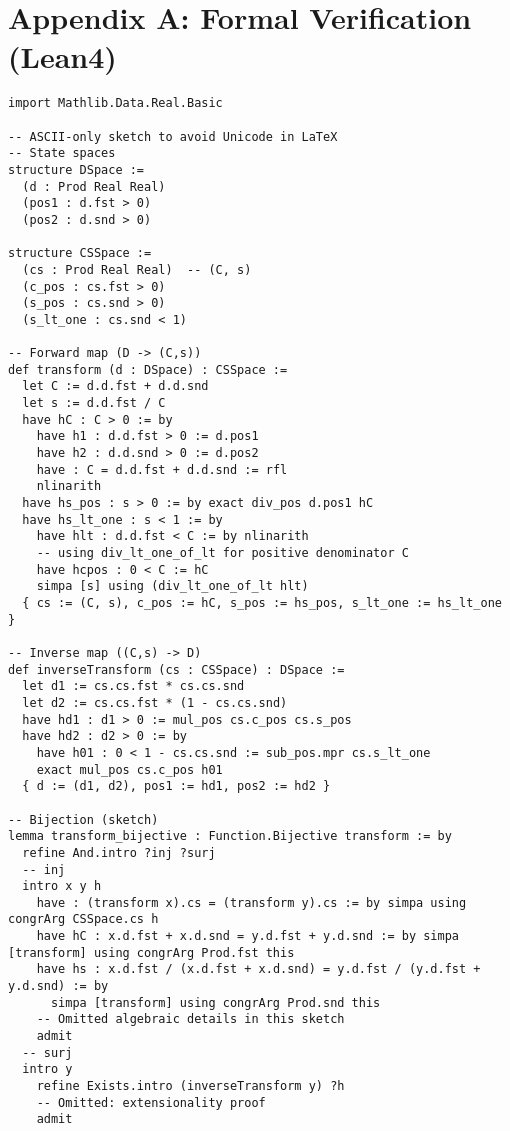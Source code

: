 ﻿\documentclass[11pt,letterpaper,oneside]{article}
\numberwithin{equation}{section}
\newcommand{\1}{\mathbf{1}}
\begin{document}
\appendix
\section{Appendix A: Formal Verification (Lean4)}\label{app:lean_verification}
\begin{leanproof}
\begin{lstlisting}[basicstyle=\ttfamily\small]
import Mathlib.Data.Real.Basic

-- ASCII-only sketch to avoid Unicode in LaTeX
-- State spaces
structure DSpace :=
  (d : Prod Real Real)
  (pos1 : d.fst > 0)
  (pos2 : d.snd > 0)

structure CSSpace :=
  (cs : Prod Real Real)  -- (C, s)
  (c_pos : cs.fst > 0)
  (s_pos : cs.snd > 0)
  (s_lt_one : cs.snd < 1)

-- Forward map (D -> (C,s))
def transform (d : DSpace) : CSSpace :=
  let C := d.d.fst + d.d.snd
  let s := d.d.fst / C
  have hC : C > 0 := by
    have h1 : d.d.fst > 0 := d.pos1
    have h2 : d.d.snd > 0 := d.pos2
    have : C = d.d.fst + d.d.snd := rfl
    nlinarith
  have hs_pos : s > 0 := by exact div_pos d.pos1 hC
  have hs_lt_one : s < 1 := by
    have hlt : d.d.fst < C := by nlinarith
    -- using div_lt_one_of_lt for positive denominator C
    have hcpos : 0 < C := hC
    simpa [s] using (div_lt_one_of_lt hlt)
  { cs := (C, s), c_pos := hC, s_pos := hs_pos, s_lt_one := hs_lt_one }

-- Inverse map ((C,s) -> D)
def inverseTransform (cs : CSSpace) : DSpace :=
  let d1 := cs.cs.fst * cs.cs.snd
  let d2 := cs.cs.fst * (1 - cs.cs.snd)
  have hd1 : d1 > 0 := mul_pos cs.c_pos cs.s_pos
  have hd2 : d2 > 0 := by
    have h01 : 0 < 1 - cs.cs.snd := sub_pos.mpr cs.s_lt_one
    exact mul_pos cs.c_pos h01
  { d := (d1, d2), pos1 := hd1, pos2 := hd2 }

-- Bijection (sketch)
lemma transform_bijective : Function.Bijective transform := by
  refine And.intro ?inj ?surj
  -- inj
  intro x y h
    have : (transform x).cs = (transform y).cs := by simpa using congrArg CSSpace.cs h
    have hC : x.d.fst + x.d.snd = y.d.fst + y.d.snd := by simpa [transform] using congrArg Prod.fst this
    have hs : x.d.fst / (x.d.fst + x.d.snd) = y.d.fst / (y.d.fst + y.d.snd) := by
      simpa [transform] using congrArg Prod.snd this
    -- Omitted algebraic details in this sketch
    admit
  -- surj
  intro y
    refine Exists.intro (inverseTransform y) ?h
    -- Omitted: extensionality proof
    admit
\end{lstlisting}
\end{leanproof}
\end{document}
